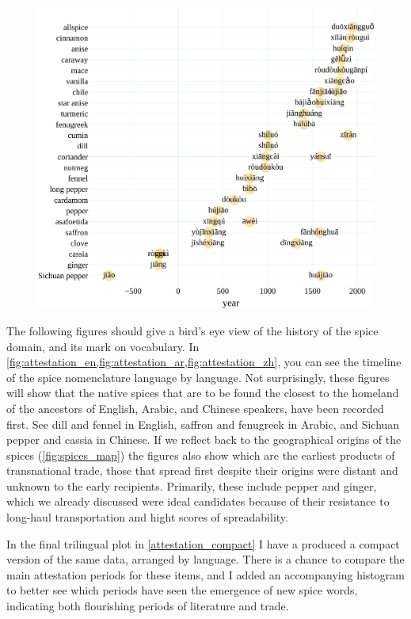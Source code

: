 \begin{figure}[!ht]
  \centering
  \includegraphics[width=\linewidth]{imgs/plots/attestation_zh.pdf}
  \caption{}
  \label{fig:attestation_zh}
\end{figure}

The following figures should give a bird's eye view of the history of the spice domain, and its mark on vocabulary. In \cref{fig:attestation_en,fig:attestation_ar,fig:attestation_zh}, you can see the timeline of the spice nomenclature language by language. Not surprisingly, these figures will show that the native spices that are to be found the closest to the homeland of the ancestors of English, Arabic, and Chinese speakers, have been recorded first. See dill and fennel in English, saffron and fenugreek in Arabic, and Sichuan pepper and cassia in Chinese. If we reflect back to the geographical origins of the spices (\cref{fig:spices_map}) the figures also show which are the earliest products of transnational trade, those that spread first despite their origins were distant and unknown to the early recipients. Primarily, these include pepper and ginger, which we already discussed were ideal candidates because of their resistance to long-haul transportation and hight scores of spreadability. 

In the final trilingual plot in \cref{attestation_compact} I have a produced a compact version of the same data, arranged by language. There is a chance to compare the main attestation periods for these items, and I added an accompanying histogram to better see which periods have seen the emergence of new spice words, indicating both flourishing periods of literature and trade. 


